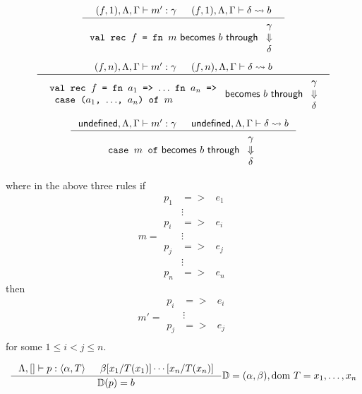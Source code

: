 \[
\inference{
  (f, 1), \Lambda, \Gamma |- m' : \gamma &
  (f, 1), \Lambda, \Gamma |- \delta \leadsto b
}{\becomesthrough{\texttt{val
      rec $f$ = fn $m$}}{b}{
    \begin{array}{c}
      \gamma\\
      \Downarrow\\
      \delta
    \end{array}
}}
\]
\[
\inference{
  (f, n), \Lambda, \Gamma |- m' : \gamma &
  (f, n), \Lambda, \Gamma |- \delta \leadsto b
}{\becomesthrough{
    \begin{array}{l}
      \texttt{val rec $f$ = fn $a_1$ => $\ldots$ fn $a_n$ =>}\\
      \texttt{  case ($a_1$, $\ldots$, $a_n$) of $m$}
    \end{array}
  }{b}{
    \begin{array}{c}
      \gamma\\
      \Downarrow\\
      \delta
    \end{array}
}}
\]
\[
\inference{
  \textsf{undefined}, \Lambda, \Gamma |- m' : \gamma &
  \textsf{undefined}, \Lambda, \Gamma |- \delta \leadsto b
}
{
  \becomesthrough{\texttt{case $m$ of}}{b}{
    \begin{array}{c}
      \gamma\\
      \Downarrow\\
      \delta
    \end{array}
  }
}
\]

where in the above three rules if
\[
m =
\begin{array}{lll}
  p_1 &=>& e_1\\
  &\vdots&\\
  p_i &=>& e_i\\
  &\vdots&\\
  p_j &=>& e_j\\
  &\vdots&\\
  p_n &=>& e_n
\end{array}
\]
then
\[
m' =
\begin{array}{lll}
  p_i &=>& e_i\\
  &\vdots&\\
  p_j &=>& e_j\\
\end{array}
\]
for some $1 \leq i < j \leq n$.

\[
\inference
{
  \Lambda, [] |- p : \langle \alpha, T \rangle&
  \beta[x_1/T(x_1)]\cdots[x_n/T(x_n)]
}
{
  \mathbb{D}(p) = b
}
{
  \mathbb{D} = (\alpha, \beta), \text{dom } T = x_1, \ldots, x_n
}
\]

